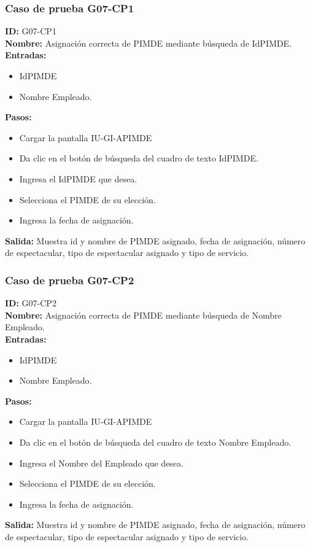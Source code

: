 \subsubsection{Caso de prueba G07-CP1}
\textbf{ID:} G07-CP1\\
\textbf{Nombre:} Asignación correcta de PIMDE mediante búsqueda de IdPIMDE.\\
\textbf{Entradas:} 
\begin{itemize}
    \item IdPIMDE
    \item Nombre Empleado.
\end{itemize}
\textbf{Pasos:}
\begin{itemize}
    \item Cargar la pantalla IU-GI-APIMDE
    \item Da clic en el botón de búsqueda del cuadro de texto IdPIMDE.
    \item Ingresa el IdPIMDE que desea.
    \item Selecciona el PIMDE de su elección.
    \item Ingresa la fecha de asignación.
\end{itemize}
\textbf{Salida:}
Muestra id y nombre de PIMDE asignado, fecha de asignación, número de espectacular, tipo de espectacular asignado y tipo de servicio.

\subsubsection{Caso de prueba G07-CP2}
\textbf{ID:} G07-CP2\\
\textbf{Nombre:} Asignación correcta de PIMDE mediante búsqueda de Nombre Empleado.\\
\textbf{Entradas:} 
\begin{itemize}
    \item IdPIMDE
    \item Nombre Empleado.
\end{itemize}
\textbf{Pasos:}
\begin{itemize}
    \item Cargar la pantalla IU-GI-APIMDE
    \item Da clic en el botón de búsqueda del cuadro de texto Nombre Empleado.
    \item Ingresa el Nombre del Empleado que desea.
    \item Selecciona el PIMDE de su elección.
    \item Ingresa la fecha de asignación.
\end{itemize}
\textbf{Salida:}
Muestra id y nombre de PIMDE asignado, fecha de asignación, número de espectacular, tipo de espectacular asignado y tipo de servicio.
\clearpage

